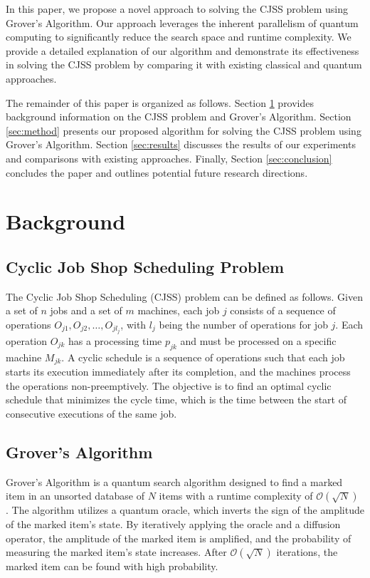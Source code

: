 In this paper, we propose a novel approach to solving the CJSS problem using Grover's Algorithm. Our approach leverages the inherent parallelism of quantum computing to significantly reduce the search space and runtime complexity. We provide a detailed explanation of our algorithm and demonstrate its effectiveness in solving the CJSS problem by comparing it with existing classical and quantum approaches.

The remainder of this paper is organized as follows. Section \ref{sec:background} provides background information on the CJSS problem and Grover's Algorithm. Section \ref{sec:method} presents our proposed algorithm for solving the CJSS problem using Grover's Algorithm. Section \ref{sec:results} discusses the results of our experiments and comparisons with existing approaches. Finally, Section \ref{sec:conclusion} concludes the paper and outlines potential future research directions.

\section{Background}
\label{sec:background}

\subsection{Cyclic Job Shop Scheduling Problem}
The Cyclic Job Shop Scheduling (CJSS) problem can be defined as follows. Given a set of $n$ jobs and a set of $m$ machines, each job $j$ consists of a sequence of operations $O_{j1}, O_{j2}, \dots, O_{jl_j}$, with $l_j$ being the number of operations for job $j$. Each operation $O_{jk}$ has a processing time $p_{jk}$ and must be processed on a specific machine $M_{jk}$. A cyclic schedule is a sequence of operations such that each job starts its execution immediately after its completion, and the machines process the operations non-preemptively. The objective is to find an optimal cyclic schedule that minimizes the cycle time, which is the time between the start of consecutive executions of the same job.

\subsection{Grover's Algorithm}
Grover's Algorithm is a quantum search algorithm designed to find a marked item in an unsorted database of $N$ items with a runtime complexity of $\mathcal{O}(\sqrt{N})$ \cite{grover1996fast}. The algorithm utilizes a quantum oracle, which inverts the sign of the amplitude of the marked item's state. By iteratively applying the oracle and a diffusion operator, the amplitude of the marked item is amplified, and the probability of measuring the marked item's state increases. After $\mathcal{O}(\sqrt{N})$ iterations, the marked item can be found with high probability.

